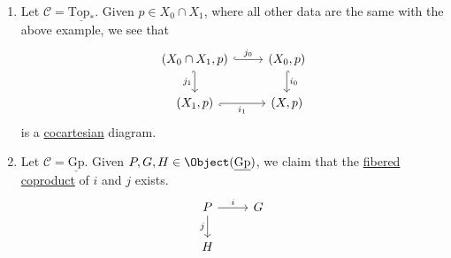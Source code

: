 \begin{eg}
\begin{enumerate}
\begin{proof}
			      \[
				      h(x) = \begin{dcases}
					      f(x), & \text{ if } x\in X_0; \\
					      g(x), & \text{ if } x\in X_1.
				      \end{dcases}
			      \]
			      \(h\) is clearly well-defined since the diagram commutes, so if \(x\in X_0 \cap X_1\), then \(f(x) = g(x)\).
			      The only thing we need to show is that \(h\) is continuous. But this is obvious too since \(X = \mathrm{int}(X_0) \cup \mathrm{int}(X_1)\), and
			      \[
				      \at{h}{\mathrm{int}(X_0)}{} = \at{f}{\mathrm{int}(X_0)}{},\quad \at{h}{\mathrm{int}(X_1)}{} = \at{g}{\mathrm{int}(X_1)}{}.
			      \]
			      The uniqueness is trivial, hence this is indeed a \hyperref[def:cocartesian]{cocartesian} diagram.
		      \end{proof}
		\item Let \(\mathscr{C} = \underline{\mathrm{Top}_\ast}\). Given \(p\in X_0\cap X_1\), where all other data are the same with the above example, we see that
		      \[\begin{tikzcd}
				      {(X_0\cap X_1, p)} & {(X_0, p)} \\
				      {(X_1, p)} & {(X, p)}
				      \arrow["{j_1}"', hook', from=1-1, to=2-1]
				      \arrow["{i_1}"', hook', from=2-1, to=2-2]
				      \arrow["{i_0}", hook, from=1-2, to=2-2]
				      \arrow["{j_0}", hook, from=1-1, to=1-2]
			      \end{tikzcd}\]
		      is a \hyperref[def:cocartesian]{cocartesian} diagram.
		\item Let \(\mathscr{C} = \underline{\mathrm{Gp}}\). Given \(P, G, H\in \Object (\underline{\mathrm{Gp}})\), we claim that the \hyperref[def:fibered-coproduct]{fibered coproduct}
		      of \(i\) and \(j\) exists.
		      \[\begin{tikzcd}
				      P & G \\
				      H
				      \arrow["j"', from=1-1, to=2-1]
				      \arrow["i", from=1-1, to=1-2]
			      \end{tikzcd}\]


\end{enumerate}
\end{eg}
